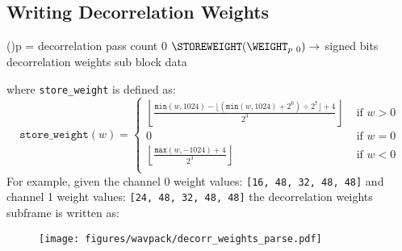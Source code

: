 \subsection{Writing Decorrelation Weights}
\For(){p = decorrelation pass count \emph{\KwDownTo}0}{
  $\texttt{\STOREWEIGHT}(\text{\WEIGHT}_{p~0}) \rightarrow$  signed bits\;
}
\Return decorrelation weights sub block data\;
\EALGORITHM
\par
\noindent
where \texttt{store\_weight} is defined as:
\begin{equation*}
\texttt{store\_weight}(w) =
\begin{cases}
\left\lfloor\frac{\texttt{min}(w, 1024) - \lfloor(\texttt{min}(w,1024) + 2 ^ 6) \div 2 ^ 7\rfloor + 4}{2 ^ 3}\right\rfloor & \text{ if } w > 0 \\
0 & \text{ if } w = 0 \\
\left\lfloor \frac{\texttt{max}(w, -1024) + 4}{2 ^ 3} \right\rfloor & \text{ if } w < 0 \\
\end{cases}
\end{equation*}
For example, given the channel 0 weight values: \texttt{[16, 48, 32, 48, 48]}
\newline
and channel 1 weight values: \texttt{[24, 48, 32, 48, 48]}
\newline
the decorrelation weights subframe is written as:
\begin{figure}[h]
\texttt{[image: figures/wavpack/decorr\_weights\_parse.pdf]}
\end{figure}

\clearpage

